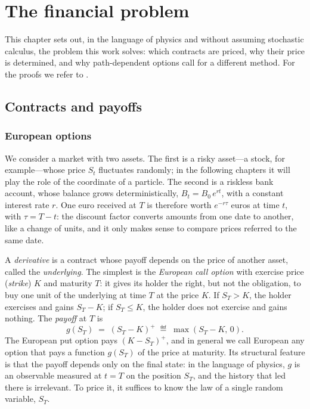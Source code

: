 \chapter{The financial problem}\label{cap:problema_financiero}

This chapter sets out, in the language of physics and without assuming
stochastic calculus, the problem this work solves: which contracts are
priced, why their price is determined, and why path-dependent options
call for a different method. For the proofs we refer to
\cite{tfgm, shreve, hull}.

\section{Contracts and payoffs}\label{sec:contratos}

\subsection{European options}\label{subsec:europeas}

We consider a market with two assets. The first is a risky
asset---a stock, for example---whose price $S_t$ fluctuates
randomly; in the following chapters it will play the role of the
coordinate of a particle. The second is a riskless bank account, whose
balance grows deterministically, $B_t = B_0\, e^{rt}$, with a constant
interest rate $r$. One euro received at $T$ is therefore worth
$e^{-r\tau}$ euros at time $t$, with $\tau = T - t$: the discount factor
converts amounts from one date to another, like a change of units, and
it only makes sense to compare prices referred to the same date.

A \emph{derivative} is a contract whose payoff depends on the price of
another asset, called the \emph{underlying}. The simplest is the
\emph{European call option} with exercise price (\emph{strike}) $K$ and
maturity $T$: it gives its holder the right, but not the obligation, to
buy one unit of the underlying at time $T$ at the price $K$. If
$S_T > K$, the holder exercises and gains $S_T - K$; if $S_T \leq K$,
the holder does not exercise and gains nothing. The \emph{payoff} at
$T$ is
\begin{equation}\label{eq:pago_call}
  g(S_T) \;=\; (S_T - K)^+ \;\eqdef\; \max(S_T - K,\, 0).
\end{equation}
The European put option pays $(K - S_T)^+$, and in general we call
European any option that pays a function $g(S_T)$ of the price at
maturity. Its structural feature is that the payoff depends only on the
final state: in the language of physics, $g$ is an observable measured
at $t = T$ on the position $S_T$, and the history that led there is
irrelevant. To price it, it suffices to know the law of a single random
variable, $S_T$.

